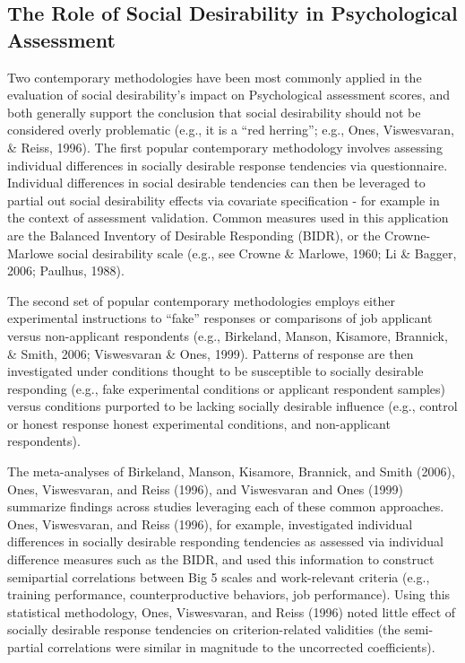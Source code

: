 \documentclass[
  english,
  ,jou]{apa6}
\begin{document}
\hypertarget{the-role-of-social-desirability-in-psychological-assessment}{%
\subsection{The Role of Social Desirability in Psychological Assessment}\label{the-role-of-social-desirability-in-psychological-assessment}}

Two contemporary methodologies have been most commonly applied in the evaluation of social desirability's impact on Psychological assessment scores, and both generally support the conclusion that social desirability should not be considered overly problematic (e.g., it is a {``red herring''}; e.g., Ones, Viswesvaran, \& Reiss, 1996). The first popular contemporary methodology involves assessing individual differences in socially desirable response tendencies via questionnaire. Individual differences in social desirable tendencies can then be leveraged to partial out social desirability effects via covariate specification - for example in the context of assessment validation. Common measures used in this application are the Balanced Inventory of Desirable Responding (BIDR), or the Crowne-Marlowe social desirability scale (e.g., see Crowne \& Marlowe, 1960; Li \& Bagger, 2006; Paulhus, 1988).

The second set of popular contemporary methodologies employs either experimental instructions to ``fake'' responses or comparisons of job applicant versus non-applicant respondents (e.g., Birkeland, Manson, Kisamore, Brannick, \& Smith, 2006; Viswesvaran \& Ones, 1999). Patterns of response are then investigated under conditions thought to be susceptible to socially desirable responding (e.g., fake experimental conditions or applicant respondent samples) versus conditions purported to be lacking socially desirable influence (e.g., control or honest response honest experimental conditions, and non-applicant respondents).

The meta-analyses of Birkeland, Manson, Kisamore, Brannick, and Smith (2006), Ones, Viswesvaran, and Reiss (1996), and Viswesvaran and Ones (1999) summarize findings across studies leveraging each of these common approaches. Ones, Viswesvaran, and Reiss (1996), for example, investigated individual differences in socially desirable responding tendencies as assessed via individual difference measures such as the BIDR, and used this information to construct semipartial correlations between Big 5 scales and work-relevant criteria (e.g., training performance, counterproductive behaviors, job performance). Using this statistical methodology, Ones, Viswesvaran, and Reiss (1996) noted little effect of socially desirable response tendencies on criterion-related validities (the semi-partial correlations were similar in magnitude to the uncorrected coefficients).
\end{document}

